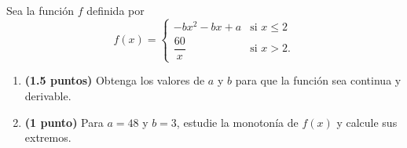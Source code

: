 
Sea la función $f$ definida por
\[
f(x)=\begin{cases}
-bx^2-bx+a & \text{si }x\leq2\\[5pt]
\dfrac{60}{x} & \text{si }x>2.
\end{cases}
\]
\begin{enumerate}[label=\alph*)]
\item \textbf{(1.5 puntos)} Obtenga los valores de $a$ y $b$ para que la función sea continua y derivable.
\item \textbf{(1 punto)} Para $a=48$ y $b=3$, estudie la monotonía de $f(x)$ y calcule sus extremos.
\end{enumerate}
